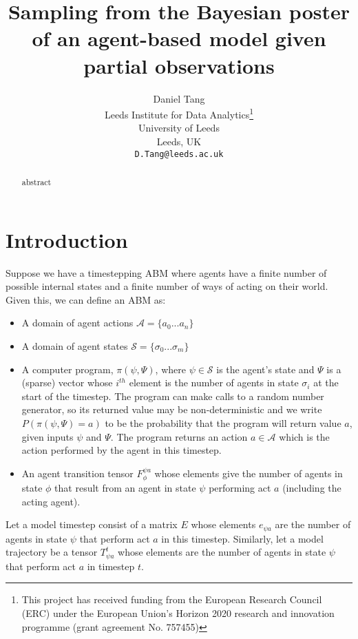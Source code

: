 \documentclass{article}
\title{Sampling from the Bayesian poster of an agent-based model given partial observations}
\author{
  Daniel Tang\\
  Leeds Institute for Data Analytics\thanks{This project has received funding from the European Research Council (ERC) under the European Union’s Horizon 2020 research and innovation programme (grant agreement No. 757455)}\\
  University of Leeds\\
  Leeds, UK\\
  \texttt{D.Tang@leeds.ac.uk} \\
}
\begin{document}
\maketitle

\begin{abstract}
abstract
\end{abstract}


\section{Introduction}


Suppose we have a timestepping ABM where agents have a finite number of possible internal states and a finite number of ways of acting on their world. Given this, we can define an ABM as:
\begin{itemize}
\item A domain of agent actions $\mathcal{A} =\{ a_0 ... a_n \}$

\item A domain of agent states $\mathcal{S} = \{\sigma_0 ... \sigma_m\}$

\item A computer program, $\pi(\psi,\Psi)$,  where $\psi \in \mathcal{S}$ is the agent's state and $\Psi$ is a (sparse) vector whose $i^{th}$ element is the number of agents in state $\sigma_i$ at the start of the timestep. The program can make calls to a random number generator, so its returned value may be non-deterministic and we write $P(\pi(\psi,\Psi)=a)$ to be the probability that the program will return value $a$, given inputs $\psi$ and $\Psi$. The program returns an action $a \in \mathcal{A}$ which is the action  performed by the agent in this timestep.

\item An agent transition tensor $F_\phi^{\psi a}$ whose elements give the number of agents in state $\phi$ that result from an agent in state $\psi$ performing act $a$ (including the acting agent).
\end{itemize}

Let a model timestep consist of a matrix $E$ whose elements $e_{\psi a}$ are the number of agents in state $\psi$ that perform act $a$ in this timestep. Similarly, let a model trajectory be a tensor $T^t_{\psi a}$ whose elements are the number of agents in state $\psi$ that perform act $a$ in timestep $t$.
\end{document}
